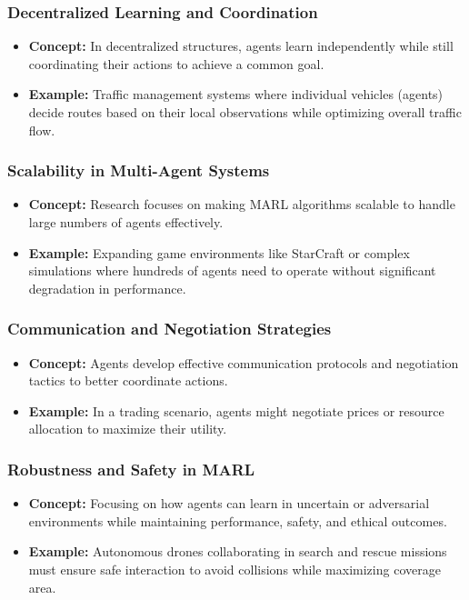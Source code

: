 \documentclass[aspectratio=169]{beamer}
\begin{document}
\begin{frame}[fragile]
    \frametitle{Decentralized Learning and Coordination}
    \begin{itemize}
        \item \textbf{Concept:} In decentralized structures, agents learn independently while still coordinating their actions to achieve a common goal.
        \item \textbf{Example:} Traffic management systems where individual vehicles (agents) decide routes based on their local observations while optimizing overall traffic flow.
    \end{itemize}
\end{frame}

\begin{frame}[fragile]
    \frametitle{Scalability in Multi-Agent Systems}
    \begin{itemize}
        \item \textbf{Concept:} Research focuses on making MARL algorithms scalable to handle large numbers of agents effectively.
        \item \textbf{Example:} Expanding game environments like StarCraft or complex simulations where hundreds of agents need to operate without significant degradation in performance.
    \end{itemize}
\end{frame}

\begin{frame}[fragile]
    \frametitle{Communication and Negotiation Strategies}
    \begin{itemize}
        \item \textbf{Concept:} Agents develop effective communication protocols and negotiation tactics to better coordinate actions.
        \item \textbf{Example:} In a trading scenario, agents might negotiate prices or resource allocation to maximize their utility.
    \end{itemize}
\end{frame}

\begin{frame}[fragile]
    \frametitle{Robustness and Safety in MARL}
    \begin{itemize}
        \item \textbf{Concept:} Focusing on how agents can learn in uncertain or adversarial environments while maintaining performance, safety, and ethical outcomes.
        \item \textbf{Example:} Autonomous drones collaborating in search and rescue missions must ensure safe interaction to avoid collisions while maximizing coverage area.
    \end{itemize}
\end{frame}
\end{document}
